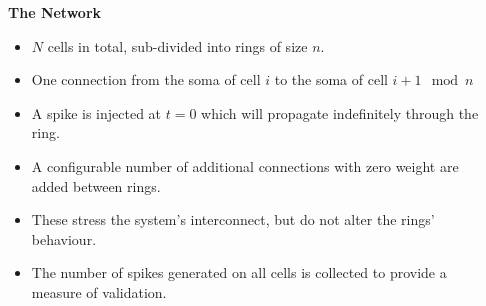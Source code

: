 \documentclass{beamer}
\begin{document}
\begin{frame}[t, fragile]
\begin{columns}[t]
\begin{column}[T]{0.45\textwidth}
    \end{column}
    \begin{column}[T]{0.25\textwidth}
      \textbf{The Network}
      \begin{itemize}
        \item $N$ cells in total, sub-divided into rings of size $n$.
        \item One connection from the soma of cell $i$ to the soma of cell $i + 1 \mod n$
        \item A spike is injected at $t=0$ which will propagate indefinitely through the ring.
        \item A configurable number of additional connections with zero weight
              are added between rings.
        \item These stress the system's interconnect, but do not alter the
              rings' behaviour.
        \item The number of spikes generated on all cells is collected to
              provide a measure of validation.
      \end{itemize}
    \end{column}
  \end{columns}


\end{frame}
\end{document}
